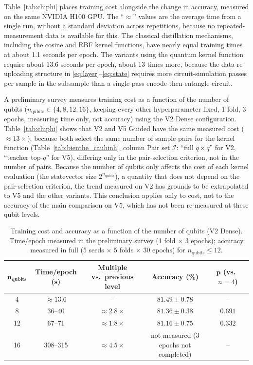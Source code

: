 Table~\ref{tab:chiphi} places training cost alongside the change in
accuracy, measured on the same NVIDIA H100 GPU. The ``$\approx$''
values are the average time from a single run, without a standard
deviation across repetitions, because no repeated-measurement data
is available for this. The classical distillation mechanisms,
including the cosine and RBF kernel functions, have nearly equal
training times at about 1.1 seconds per epoch. The variants using
the quantum kernel function require about 13.6 seconds per epoch,
about 13 times more, because the data re-uploading structure in
\eqref{eq:layer}--\eqref{eq:state} requires more circuit-simulation
passes per sample in the subsample than a single-pass
encode-then-entangle circuit.

A preliminary survey measures training cost as a function of the
number of qubits ($n_{\text{qubits}} \in \{4, 8, 12, 16\}$, keeping
every other hyperparameter fixed, 1 fold, 3 epochs, measuring time
only, not accuracy) using the V2 Dense configuration.
Table~\ref{tab:chiphi} shows that V2 and V5 Guided have the same
measured cost ($\approx 13\times$), because both select the same
number of sample pairs for the kernel function
(Table~\ref{tab:bienthe_cauhinh}, column Pair set $\mathcal{I}$:
``full $q\times q$'' for V2, ``teacher top-$q$'' for V5), differing
only in the pair-selection criterion, not in the number of pairs.
Because the number of qubits only affects the cost of each kernel
evaluation (the statevector size $2^{n_{\text{qubits}}}$), a
quantity that does not depend on the pair-selection criterion, the
trend measured on V2 has grounds to be extrapolated to V5 and the
other variants. This conclusion applies only to cost, not to the
accuracy of the main comparison on V5, which has not been
re-measured at these qubit levels.

\begin{table}[!htbp]
\centering
\caption{Training cost and accuracy as a function of the number of
qubits (V2 Dense). Time/epoch measured in the preliminary survey (1
fold $\times$ 3 epochs); accuracy measured in full (5 seeds $\times$
5 folds $\times$ 30 epochs) for $n_{\text{qubits}} \le 12$.}
\label{tab:qubitcost}
\footnotesize
\begin{tabular}{ccccc}
\toprule
$\boldsymbol{n_{\text{qubits}}}$ & \textbf{Time/epoch (s)} & \textbf{Multiple vs.\ previous level} & \textbf{Accuracy (\%)} & $\boldsymbol{p}$ \textbf{(vs.\ $n=4$)} \\
\midrule
4  & $\approx 13.6$ & -- & $81.49 \pm 0.78$ & -- \\
8  & 36--40 & $\approx 2.8\times$ & $81.36 \pm 0.38$ & $0.691$ \\
12 & 67--71 & $\approx 1.8\times$ & $81.16 \pm 0.75$ & $0.332$ \\
16 & 308--315 & $\approx 4.5\times$ & not measured (3 epochs not completed) & -- \\
\bottomrule
\end{tabular}
\end{table}
\FloatBarrier

